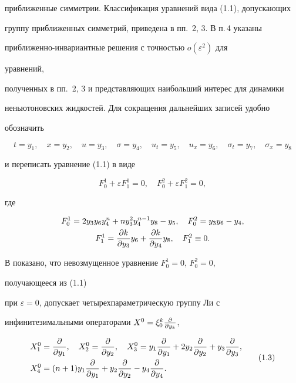 приближенные симметрии. Классификация уравнений вида (1.1), допускающих


группу приближенных симметрий, приведена в пп.~2, 3. В п.\,4 указаны


приближенно-инвариантные решения с точностью $o(\varepsilon^2)$ для


уравнений,


полученных в пп.~2, 3 и представляющих наибольший интерес для динамики


неньютоновских жидкостей. Для сокращения дальнейших записей удобно


обозначить


$$


t=y_1,\quad x=y_2,\quad u=y_3,\quad \sigma=y_4,\quad


u_t=y_5,\quad u_x=y_6,\quad \sigma_t=y_7,\quad \sigma_x=y_8


$$


и переписать уравнение (1.1) в виде


\begin{equation}


F^1_0+\varepsilon F^1_1=0,\quad F^2_0+\varepsilon F^2_1=0,


\tag{1.2}


\end{equation}


где


\begin{gather*}


F^1_0=2y_3y_6y^n_4+ny^2_3y^{n-1}_4y_8-y_5,\quad


F^2_0=y_3y_6-y_4,\\


F^1_1=\frac{\pa k}{\dy_3}y_6+\frac{\pa k}{\dy_4}y_8,\quad


F^2_1\equiv 0.


\end{gather*}


В \cite{Sal} показано, что невозмущенное уравнение $F^1_0=0$, $F^2_0=0$,


получающееся из (1.1)


при $\varepsilon=0$, допускает четырехпараметрическую группу Ли с


инфинитезимальными операторами $X^0=\xi^k_0\frac{\partial}{\partial y_k}$,


\begin{equation}


\begin{split}


X^0_1&=\frac{\pa}{\dy_1},\quad X^0_2=\frac{\pa}{\dy_2},\quad


X^0_3=y_1\frac{\pa}{\dy_1}+2y_2\frac{\pa}{\dy_2}+


y_3\frac{\pa}{\dy_3},\\


X^0_4&=(n+1)y_1\frac{\pa}{\dy_1}+y_2\frac{\pa}{\dy_2}-


y_4\frac{\pa}{\dy_4}.


\end{split}


\tag{1.3}


\end{equation}





